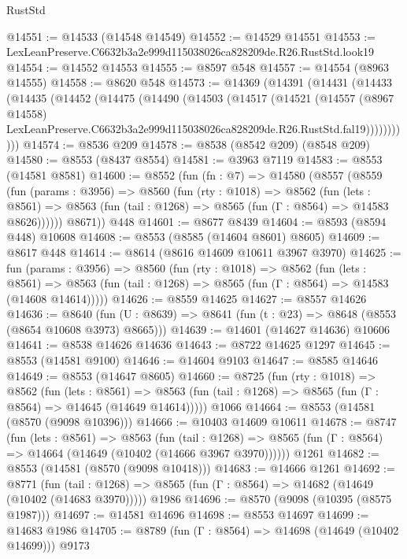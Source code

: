 \begin{lexlean}{RustStd}
\begin{coremodule}
@14551 := @14533 (@14548 @14549)
@14552 := @14529 @14551
@14553 := LexLeanPreserve.C6632b3a2e999d115038026ca828209de.R26.RustStd.look19
@14554 := @14552 @14553
@14555 := @8597 @548
@14557 := @14554 (@8963 @14555)
@14558 := @8620 @548
@14573 := @14369
    (@14391
      (@14431
        (@14433
          (@14435
            (@14452
              (@14475
                (@14490
                  (@14503
                    (@14517
                      (@14521
                        (@14557
                          (@8967 @14558)
                          LexLeanPreserve.C6632b3a2e999d115038026ca828209de.R26.RustStd.fal19)))))))))))
@14574 := @8536 @209
@14578 := @8538 (@8542 @209) (@8548 @209)
@14580 := @8553 (@8437 @8554)
@14581 := @3963 @7119
@14583 := @8553 (@14581 @8581)
@14600 := @8552
    (fun (fn : @7) =>
    @14580
      (@8557
        (@8559
          (fun (params : @3956) =>
          @8560
            (fun (rty : @1018) =>
            @8562
              (fun (lets : @8561) =>
              @8563 (fun (tail : @1268) => @8565 (fun (Γ : @8564) => @14583 @8626))))))
        @8671))
    @448
@14601 := @8677 @8439
@14604 := @8593 (@8594 @448) @10608
@14608 := @8553 (@8585 (@14604 @8601) @8605)
@14609 := @8617 @448
@14614 := @8614 (@8616 @14609 @10611 @3967 @3970)
@14625 := fun (params : @3956) =>
  @8560
    (fun (rty : @1018) =>
    @8562
      (fun (lets : @8561) =>
      @8563 (fun (tail : @1268) => @8565 (fun (Γ : @8564) => @14583 (@14608 @14614)))))
@14626 := @8559 @14625
@14627 := @8557 @14626
@14636 := @8640
    (fun (U : @8639) => @8641 (fun (t : @23) => @8648 (@8553 (@8654 @10608 @3973) @8665)))
@14639 := @14601 (@14627 @14636) @10606
@14641 := @8538 @14626 @14636
@14643 := @8722 @14625 @1297
@14645 := @8553 (@14581 @9100)
@14646 := @14604 @9103
@14647 := @8585 @14646
@14649 := @8553 (@14647 @8605)
@14660 := @8725
    (fun (rty : @1018) =>
    @8562
      (fun (lets : @8561) =>
      @8563 (fun (tail : @1268) => @8565 (fun (Γ : @8564) => @14645 (@14649 @14614)))))
    @1066
@14664 := @8553 (@14581 (@8570 (@9098 @10396)))
@14666 := @10403 @14609 @10611
@14678 := @8747
    (fun (lets : @8561) =>
    @8563
      (fun (tail : @1268) =>
      @8565 (fun (Γ : @8564) => @14664 (@14649 (@10402 (@14666 @3967 @3970))))))
    @1261
@14682 := @8553 (@14581 (@8570 (@9098 @10418)))
@14683 := @14666 @1261
@14692 := @8771
    (fun (tail : @1268) => @8565 (fun (Γ : @8564) => @14682 (@14649 (@10402 (@14683 @3970)))))
    @1986
@14696 := @8570 (@9098 (@10395 (@8575 @1987)))
@14697 := @14581 @14696
@14698 := @8553 @14697
@14699 := @14683 @1986
@14705 := @8789 (fun (Γ : @8564) => @14698 (@14649 (@10402 @14699))) @9173

\end{coremodule}
\end{lexlean}
